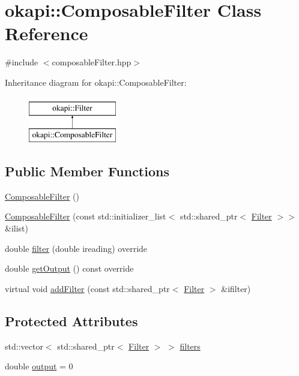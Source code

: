 \hypertarget{classokapi_1_1ComposableFilter}{}\section{okapi\+::Composable\+Filter Class Reference}
\label{classokapi_1_1ComposableFilter}


{\ttfamily \#include $<$composable\+Filter.\+hpp$>$}

Inheritance diagram for okapi\+::Composable\+Filter\+:\begin{figure}[H]
\begin{center}
\leavevmode
\includegraphics[height=2.000000cm]{classokapi_1_1ComposableFilter}
\end{center}
\end{figure}
\subsection*{Public Member Functions}
\begin{DoxyCompactItemize}
\item 
\mbox{\hyperlink{classokapi_1_1ComposableFilter_a02bc789153f129d7de29ff96bd8d79d6}{Composable\+Filter}} ()
\item 
\mbox{\hyperlink{classokapi_1_1ComposableFilter_ab435425858bcf6710a9ffc1fdcd84fa0}{Composable\+Filter}} (const std\+::initializer\+\_\+list$<$ std\+::shared\+\_\+ptr$<$ \mbox{\hyperlink{classokapi_1_1Filter}{Filter}} $>$$>$ \&ilist)
\item 
double \mbox{\hyperlink{classokapi_1_1ComposableFilter_a76925f04dcd186b249e5bfb169f27992}{filter}} (double ireading) override
\item 
double \mbox{\hyperlink{classokapi_1_1ComposableFilter_a2d54899ce84c463af2f22cfbf36c7c7c}{get\+Output}} () const override
\item 
virtual void \mbox{\hyperlink{classokapi_1_1ComposableFilter_a61d20215a1d89357c8720d04b23a31ed}{add\+Filter}} (const std\+::shared\+\_\+ptr$<$ \mbox{\hyperlink{classokapi_1_1Filter}{Filter}} $>$ \&ifilter)
\end{DoxyCompactItemize}
\subsection*{Protected Attributes}
\begin{DoxyCompactItemize}
\item 
std\+::vector$<$ std\+::shared\+\_\+ptr$<$ \mbox{\hyperlink{classokapi_1_1Filter}{Filter}} $>$ $>$ \mbox{\hyperlink{classokapi_1_1ComposableFilter_a83da1d231c702e8db79557a2b458fc90}{filters}}
\item 
double \mbox{\hyperlink{classokapi_1_1ComposableFilter_ab956536a303c97c86fd2ec3af3c35eef}{output}} = 0
\end{DoxyCompactItemize}


